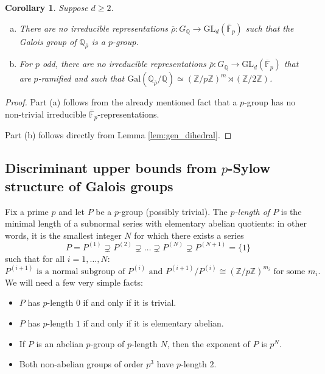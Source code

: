 \documentclass{amsart}
\newtheorem{corollary}[theorem]{Corollary}
\theoremstyle{definition}
\newcommand{\lra}{\longrightarrow}
\newcommand{\Q}{\mathbb{Q}}
\newcommand{\Z}{\mathbb{Z}}
\newcommand{\F}{\mathbb{F}}
\newcommand{\bF}{\overline{\F}}
\newcommand{\br}{\overline{\rho}}
\newcommand{\GL}{\mathrm{GL}}
\newcommand{\Gal}{\mathrm{Gal}}
\renewcommand{\geq}{\geqslant}
\begin{document}
\begin{corollary}\label{cor:gen_dihedral}
  Suppose $d\geq 2$.
  \begin{enumerate}[(a)]
    \item There are no irreducible representations $\br\colon G_\Q\lra\GL_d(\bF_p)$ such that the Galois group of $\Q_{\br}$ is a $p$-group.
    \item For $p$ odd, there are no irreducible representations $\br\colon G_\Q\lra\GL_d(\bF_p)$ that are $p$-ramified and such that $\Gal(\Q_{\br}/\Q)\simeq (\Z/p\Z)^m\rtimes(\Z/2\Z)$.
  \end{enumerate}
\end{corollary}
\begin{proof}
  Part (a) follows from the already mentioned fact that a $p$-group has no non-trivial irreducible $\bF_p$-representations.

  Part (b) follows directly from Lemma \ref{lem:gen_dihedral}.
\end{proof}

\subsection{Discriminant upper bounds from \texorpdfstring{$p$}{p}-Sylow structure of Galois groups}

Fix a prime $p$ and let $P$ be a $p$-group (possibly trivial).
The \emph{$p$-length of $P$} is the minimal length of a subnormal series with elementary abelian quotients: in other words, it is the smallest integer $N$ for which there exists a series
\begin{equation}\label{elem_series_1}
  P=P^{(1)}\supsetneq P^{(2)}\supsetneq\dots\supsetneq P^{(N)}\supsetneq P^{(N+1)}=\{1\}
\end{equation}
such that for all $i=1,\dots,N$:
\begin{equation*}
  P^{(i+1)} \text{ is a normal subgroup of } P^{(i)} \text{ and } P^{(i+1)}/P^{(i)}\cong (\Z/p\Z)^{m_i} \text{ for some $m_i$}.
\end{equation*}
We will need a few very simple facts:
\begin{itemize}
  \item $P$ has $p$-length $0$ if and only if it is trivial.
  \item $P$ has $p$-length $1$ if and only if it is elementary abelian.
  \item If $P$ is an abelian $p$-group of $p$-length $N$, then the exponent of $P$ is $p^N$.
  \item Both non-abelian groups of order $p^3$ have $p$-length $2$.
\end{itemize}
\end{document}
